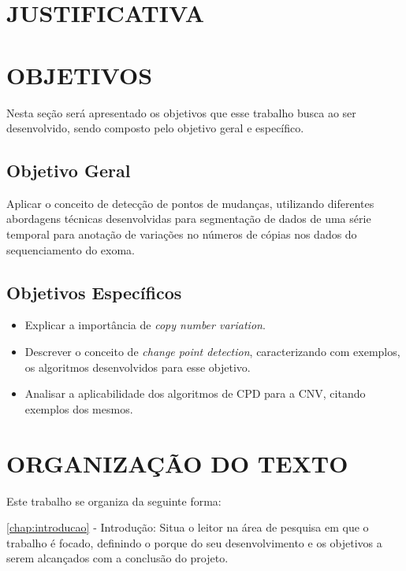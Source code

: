 \section{JUSTIFICATIVA}



\section{OBJETIVOS}

Nesta seção será apresentado os objetivos que esse trabalho busca ao ser desenvolvido, sendo composto pelo objetivo geral e específico.

\subsection{Objetivo Geral}

Aplicar o conceito de detecção de pontos de mudanças, utilizando diferentes abordagens técnicas desenvolvidas para segmentação de dados de uma série temporal para anotação de variações no números de cópias nos dados do sequenciamento do exoma.

\subsection{Objetivos Específicos}
	
\begin{itemize}
    \item Explicar a importância de \textit{copy number variation}.
    \item Descrever o conceito de \textit{change point detection}, caracterizando com exemplos, os algoritmos desenvolvidos para esse objetivo.
    \item Analisar a aplicabilidade dos algoritmos de CPD para a CNV, citando exemplos dos mesmos.
\end{itemize}

\section{ORGANIZAÇÃO DO TEXTO}

Este trabalho se organiza da seguinte forma:

\autoref{chap:introducao} - Introdução: Situa o leitor na área de pesquisa em que o trabalho é focado, definindo o porque do seu desenvolvimento e os objetivos a serem alcançados com a conclusão do projeto.


